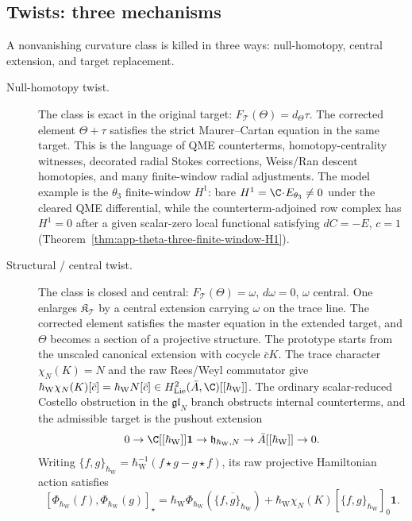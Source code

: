 \subsection{Twists: three mechanisms}\label{ssec:master-deformation-twist}

A nonvanishing curvature class is killed in three ways:
null-homotopy, central extension, and target replacement.

\begin{description}
\item[Null-homotopy twist.]  The class is exact in the original target:
\(F_{\mathcal T}(\Theta)=d_\Theta\tau\).  The corrected element
\(\Theta+\tau\) satisfies the strict Maurer--Cartan equation in the
same target.  This is the language of QME counterterms,
homotopy-centrality witnesses, decorated radial Stokes corrections,
Weiss/Ran descent homotopies, and many finite-window radial
adjustments.  The model example is the \(\theta_3\) finite-window
\(H^1\): bare \(H^1=\C\!\cdot\!E_{\theta_3}\ne0\) under the cleared
QME differential, while the counterterm-adjoined row complex has
\(H^1=0\) after a given scalar-zero local functional satisfying
\(dC=-E\), \(c=1\)
(Theorem~\ref{thm:app-theta-three-finite-window-H1}).
\item[Structural / central twist.]  The class is closed and central:
\(F_{\mathcal T}(\Theta)=\omega\), \(d\omega=0\), \(\omega\) central.
One enlarges \(\mathfrak K_{\mathcal T}\) by a central
extension carrying \(\omega\) on the trace line.  The corrected
element satisfies the master equation in the extended target, and
\(\Theta\) becomes a section of a projective structure.  The prototype
starts from the unscaled canonical extension with cocycle \(\bar cK\).
The trace character \(\chi_N(K)=N\) and the raw Rees/Weyl commutator
give
\(\hbar_{\mathrm{W}}\chi_N(K)[\bar c]
=\hbar_{\mathrm{W}}N[\bar c]\in
H^2_{\mathrm{Lie}}(\bar A,\C)[[\hbar_{\mathrm{W}}]]\).  The ordinary
scalar-reduced Costello obstruction in the \(\mathfrak{gl}_N\)
branch obstructs internal counterterms, and the admissible target is the
pushout extension
\[
  0\to\C[[\hbar_{\mathrm W}]]\mathbf 1
  \to\mathfrak h_{\hbar_{\mathrm{W}},N}
  \to\bar A[[\hbar_{\mathrm W}]]\to 0.
\]
Writing
\(\{f,g\}_{\hbar_{\mathrm W}}
=\hbar_{\mathrm W}^{-1}(f\star g-g\star f)\), its raw projective
Hamiltonian action satisfies
\[
  [\Phi_{\hbar_{\mathrm{W}}}(f),
    \Phi_{\hbar_{\mathrm{W}}}(g)]_\star
  =\hbar_{\mathrm{W}}
    \Phi_{\hbar_{\mathrm{W}}}
      (\overline{\{f,g\}_{\hbar_{\mathrm W}}})
   +\hbar_{\mathrm{W}}\chi_N(K)
      [\{f,g\}_{\hbar_{\mathrm W}}]_0\mathbf 1.
\]
\end{description}
